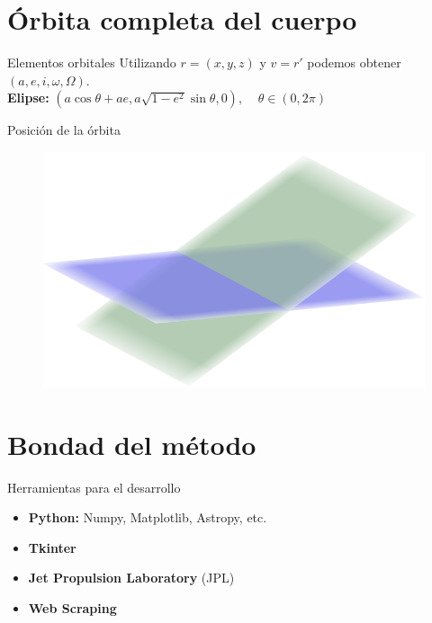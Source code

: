\documentclass{beamer}
\begin{document}
\section{Órbita completa del cuerpo}
\begin{frame}{Elementos orbitales}
Utilizando $r=(x,y,z)$ y $v=r'$ podemos obtener $(a,e,i,\omega,\Omega)$.\\
\pause
\vspace{1cm}
\textbf{Elipse:}
\hspace{0.75cm}
$
(a\cos{\theta}+ae, a\sqrt{1-e^2}\sin{\theta}, 0), \; \; \; \; \theta\in(0,2\pi)
$
\end{frame}


\begin{frame}{Posición de la órbita}
\begin{figure}[H]
\centering
\includegraphics[scale=0.41]{images/inclinacion.png}
\end{figure}
\end{frame}

\section{Bondad del método}

\begin{frame}{Herramientas para el desarrollo}
\begin{itemize}
\item \textbf{Python:} Numpy, Matplotlib, Astropy, etc.
\item \textbf{Tkinter}
\item \textbf{Jet Propulsion Laboratory} (JPL)
\item \textbf{Web Scraping}
\end{itemize}
\end{frame}
\end{document}
